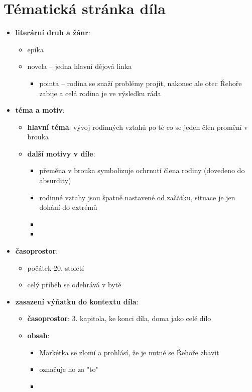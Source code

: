 \documentclass[10pt,a4paper]{article}
\begin{document}
\section*{Tématická stránka díla}
\begin{itemize}
\item \textbf{literární druh a žánr}: 
	\begin{itemize}
	\item epika
	\item novela -- jedna hlavní dějová linka 
		\begin{itemize}
		\item pointa -- rodina se snaží problémy projít, nakonec ale otec Řehoře zabije a celá rodina je ve výsledku ráda
		\end{itemize}
	\end{itemize}
\item \textbf{téma a motiv}:
	\begin{itemize}
	\item \textbf{hlavní téma}: vývoj rodinných vztahů po té co se jeden člen promění v brouka
	\item \textbf{další motivy v díle}:
		\begin{itemize}
		\item přeměna v brouka symbolizuje ochrnutí člena rodiny (dovedeno do absurdity)
		\item rodinné vztahy jsou špatně nastavené od začátku, situace je jen dohání do extrémů
		\item 
		\item 
		\end{itemize}
	\end{itemize}
\item \textbf{časoprostor}:
	\begin{itemize}
	\item počátek 20. století
	\item celý příběh se odehrává v bytě
	\end{itemize}
\item \textbf{zasazení výňatku do kontextu díla}:
	\begin{itemize}
	\item \textbf{časoprostor}: 3. kapitola, ke konci díla, doma jako celé dílo
	\item \textbf{obsah}: 
		\begin{itemize}
		\item Markétka se zlomí a prohlásí, že je nutné se Řehoře zbavit
		\item označuje ho za "to"
		\item 
		\end{itemize}
	\end{itemize}


\end{itemize}
\end{document}
